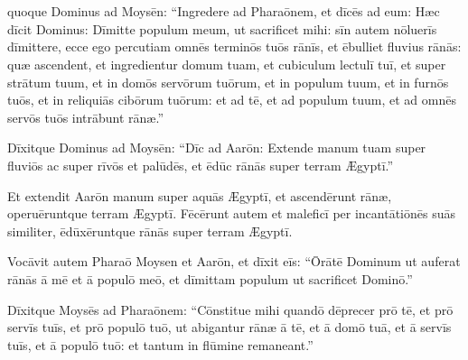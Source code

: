 \chapter{}


\thispagestyle{empty}

 quoque Dominus ad Moysēn: ``Ingredere 
ad Pharaōnem, et dīcēs ad eum: Hæc dīcit
Dominus: Dīmitte populum meum, ut sacrificet mihi: sīn autem nōluerīs
dīmittere, ecce ego percutiam omnēs terminōs tuōs
rānīs,  et ēbulliet fluvius
rānās: quæ ascendent, et ingredientur domum tuam, et cubiculum lectulī tuī, et super strātum
tuum, et in domōs servōrum tuōrum, et in populum tuum, et in
furnōs tuōs, et in reliquiās cibōrum tuōrum:
et ad tē, et ad populum tuum, et ad omnēs servōs tuōs intrābunt
rānæ.''

Dīxitque Dominus ad Moysēn: ``Dīc ad
Aarōn: Extende manum tuam super fluviōs ac super rīvōs et
palūdēs, et ēdūc rānās super terram Ægyptī.''

Et extendit Aarōn manum super aquās Ægyptī, et ascendērunt
rānæ, operuēruntque terram Ægyptī.  Fēcērunt autem et
maleficī per incantātiōnēs suās similiter, ēdūxēruntque rānās super terram Ægyptī.

Vocāvit autem Pharaō Moysen et Aarōn, et
dīxit eīs: ``Ōrātē Dominum ut auferat rānās ā mē et ā populō
meō, et dīmittam populum ut sacrificet Dominō.''

Dīxitque Moysēs
ad Pharaōnem: ``Cōnstitue mihi quandō
dēprecer prō tē, et prō servīs tuīs, et prō populō tuō, ut
abigantur rānæ ā tē, et ā domō tuā, et ā
servīs tuīs, et ā populō tuō: et tantum in flūmine remaneant.''

